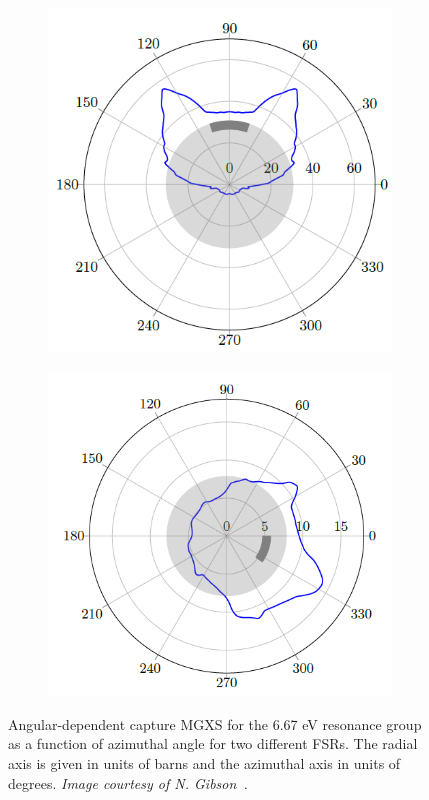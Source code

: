 \begin{figure}[h]
\begin{subfigure}{.5\textwidth}
  \centering
  \includegraphics[width=\linewidth]{figures/sph/batman-1}
  \caption{}
  \label{fig:chap6-batman-plots-a}
\end{subfigure}
\begin{subfigure}{.5\textwidth}
  \centering
  \includegraphics[width=\linewidth]{figures/sph/batman-2}
  \caption{}
  \label{fig:chap6-batman-plots-b}
\end{subfigure}
\caption[Angular-dependent capture MGXS]{Angular-dependent capture \ac{MGXS} for the 6.67 eV resonance group as a function of azimuthal angle for two different \ac{FSR}s. The radial axis is given in units of barns and the azimuthal axis in units of degrees. \textit{Image courtesy of N. Gibson~\cite{gibson2016thesis}.}}
\label{fig:chap6-batman-plots}
\end{figure}

